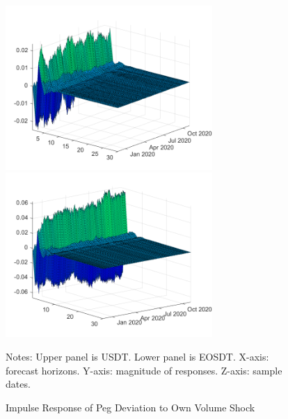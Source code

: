 \documentclass[12pt]{article}
\begin{document}
\begin{figure}
	\centering
	\caption{Impulse Response of Peg Deviation to Own Volume Shock}
	\includegraphics[width=0.7\textwidth]{shock4resp3}
	\includegraphics[width=0.7\textwidth]{shock4resp3eos}
	\label{shock43}
	\begin{minipage}{1\textwidth} 
		{\footnotesize Notes: Upper panel is USDT. Lower panel is EOSDT. X-axis: forecast horizons. Y-axis: magnitude of responses. Z-axis: sample dates. \par}
	\end{minipage}
\end{figure}
\end{document}
